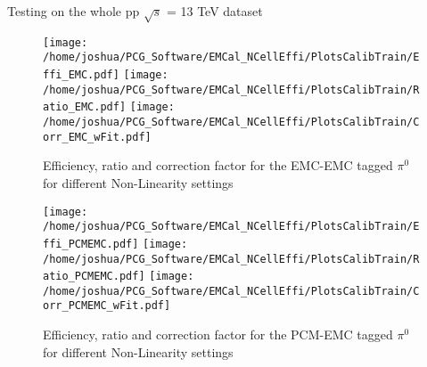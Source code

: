 \documentclass[ALICE]{ALICE_analysis_notes}
\newcommand{\PZ}{$\pi^0$\xspace}
\begin{document}
\begin{section}{Testing on the whole pp $\sqrt{s}$ = 13 TeV dataset}
	
	
	
	\begin{figure}[ht!]
		\centering
		\texttt{[image: /home/joshua/PCG\_Software/EMCal\_NCellEffi/PlotsCalibTrain/Effi\_EMC.pdf]}	
		\texttt{[image: /home/joshua/PCG\_Software/EMCal\_NCellEffi/PlotsCalibTrain/Ratio\_EMC.pdf]}	
		\texttt{[image: /home/joshua/PCG\_Software/EMCal\_NCellEffi/PlotsCalibTrain/Corr\_EMC\_wFit.pdf]}
		\caption{ Efficiency, ratio and correction factor for the EMC-EMC tagged \PZ for different Non-Linearity settings}
		\label{fig:NCellEff_Train}
		
	\end{figure}
	
	
	\begin{figure}[ht!]
		\centering
		\texttt{[image: /home/joshua/PCG\_Software/EMCal\_NCellEffi/PlotsCalibTrain/Effi\_PCMEMC.pdf]}	
		\texttt{[image: /home/joshua/PCG\_Software/EMCal\_NCellEffi/PlotsCalibTrain/Ratio\_PCMEMC.pdf]}	
		\texttt{[image: /home/joshua/PCG\_Software/EMCal\_NCellEffi/PlotsCalibTrain/Corr\_PCMEMC\_wFit.pdf]}
		\caption{ Efficiency, ratio and correction factor for the PCM-EMC tagged \PZ for different Non-Linearity settings}
		\label{fig:NCellEff_Train_PCMEMC}
		
	\end{figure}



\end{section}
\end{document}
